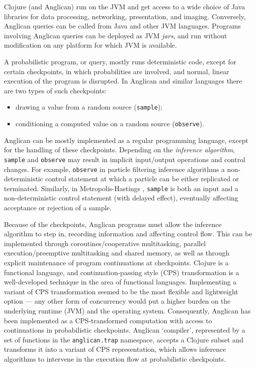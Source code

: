 \documentclass[preprint]{sigplanconf}
\begin{document}
Clojure (and Anglican) run on the JVM and get access to a wide choice of Java
libraries for data processing, networking, presentation, and imaging.
Conversely, Anglican queries can be called from Java and other JVM languages.
Programs involving Anglican queries can be deployed as JVM
\textit{jars}, and run without modification on any platform for 
which JVM is available.

A probabilistic program, or query, mostly runs deterministic
code, except for certain checkpoints, in which probabilities are
involved, and normal, linear execution of the program is
disrupted. In Anglican and similar languages there are two types of such checkpoints:
\begin{itemize} \item drawing a value from a random source (\texttt{sample});
    \item conditioning a computed value on a random source
        (\texttt{observe}).
\end{itemize}

Anglican can be mostly implemented as a regular programming
language, except for the handling of these checkpoints.
Depending on the \textit{inference algorithm}, \texttt{sample}
and \texttt{observe} may result in implicit input/output
operations and control changes. For example, \texttt{observe} in
particle filtering inference algorithms \cite{WVM14} a non-deterministic
control statement at which a particle can be either replicated
or terminated. Similarly, in Metropolis-Hastings \cite{WSG11},
\texttt{sample} is both an input and a non-deterministic control
statement (with delayed effect), eventually affecting acceptance
or rejection of a sample.

Because of the checkpoints, Anglican programs must allow the
inference algorithm to step in, recording information and
affecting control flow. This can be implemented through
coroutines/cooperative multitasking, parallel execution/preemptive
multitasking and shared memory, as well as through explicit
maintenance of program continuations at checkpoints. Clojure is
a functional language, and continuation-passing style (CPS)
transformation is a well-developed technique in the area of
functional languages. Implementing a variant of CPS
transformation seemed to be the most flexible and lightweight
option --- any other form of concurrency would put a higher burden
on the underlying runtime (JVM) and the operating system.
Consequently, Anglican has been implemented as a CPS-transformed
computation with access to continuations in probabilistic
checkpoints. Anglican `compiler', represented by a set of
functions in the \texttt{anglican.trap} namespace, accepts a
Clojure subset and transforms it into a variant of CPS
representation, which allows inference algorithms to intervene
in the execution flow at probabilistic checkpoints.
\end{document}
